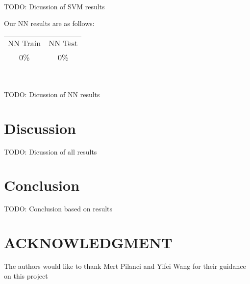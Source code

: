 \documentclass[letterpaper, 12 pt, conference]{ieeeconf}  %
\begin{document}
\par TODO: Dicussion of SVM results
\newline \,\,



\par Our NN results are as follows:
\begin{center}
    \begin{tabular}{ |c|c| }
 NN Train & NN Test \\ 
 0\% & 0\%  \\

\end{tabular}\\
\end{center}


\par TODO: Dicussion of NN results
\newline \,\,



 

\section{Discussion}

TODO: Dicussion of all results


\section{Conclusion}


TODO: Conclusion based on results



\section*{ACKNOWLEDGMENT}

The authors would like to thank Mert Pilanci and Yifei Wang for their guidance on this project
\end{document}
